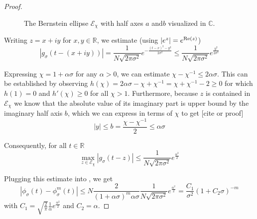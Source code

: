 \begin{proof}
    \begin{figure}[ht]
        \centering
        \caption{The Bernstein ellipse $\mathcal{E}_{\chi}$ with half axes $a$ and$b$ visualized in $\mathbb{C}$.}
        \label{fig:2-chebyshev-proof-bernstein-ellipse}
    \end{figure}

    Writing $z = x + iy$ for $x,y \in \mathbb{R}$, we estimate (using $|e^z| = e^{\operatorname{Re}(z)}$)
    \begin{equation}
        |g_{\sigma}(t - (x + iy))| %
        = \frac{1}{N \sqrt{2 \pi \sigma^2}} e^{- \frac{(t - x)^2 - y^2}{2 \sigma^2}}
        \leq \frac{1}{N \sqrt{2 \pi \sigma^2}} e^{\frac{y^2}{2 \sigma^2}}
    \end{equation}

    Expressing $\chi = 1 + \alpha \sigma$ for any $\alpha > 0$,
    we can estimate $\chi - \chi^{-1} \leq 2\alpha\sigma$.
    This can be established by observing
    $h(\chi) = 2\alpha\sigma - \chi + \chi^{-1} = \chi + \chi^{-1} - 2 \geq 0$
    for which $h(1) = 0$ and $h'(\chi) \geq 0$ for all $\chi > 1$.
    Furthermore, because $z$ is
    contained in $\mathcal{E}_{\chi}$ we know that the absolute value of its
    imaginary part is upper bound by the imaginary half axis $b$, which we can
    express in terms of $\chi$ to get [cite or proof]
    \begin{equation}
        |y| \leq b = \frac{\chi - \chi^{-1}}{2} \leq \alpha\sigma
    \end{equation}

    Consequently, for all $t \in \mathbb{R}$
    \begin{equation}
        \max_{z \in \mathcal{E}_{\chi}} |g_{\sigma}(t - z)| 
        \leq \frac{1}{N \sqrt{2 \pi \sigma^2}} e^{\frac{\alpha^2}{2}}
    \end{equation}

    Plugging this estimate into , we get
    \begin{equation}
        \left| \phi_{\sigma}(t) - \phi_{\sigma}^m(t) \right|
        \leq N \frac{2}{(1 + \alpha\sigma)^m\alpha \sigma} \frac{1}{N \sqrt{2 \pi \sigma^2}} e^{\frac{\alpha^2}{2}}
        = \frac{C_1}{\sigma^2} (1 + C_2 \sigma)^{-m}
    \end{equation}
    with $C_1=\sqrt{\frac{2}{\pi}}\frac{1}{\alpha}e^{\frac{\alpha^2}{2}}$ and $C_2=\alpha$.
\end{proof}

